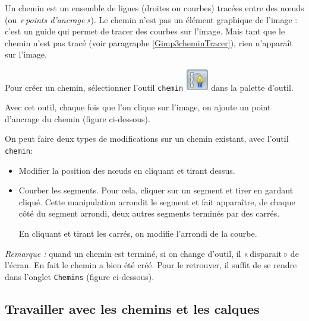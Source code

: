 Un chemin est un ensemble de lignes (droites ou courbes) tracées entre des nœuds (ou \emph{«\,points d'ancrage\,»}). Le chemin n'est pas un élément graphique de l'image : c'est un guide qui permet de tracer des courbes sur l'image. Mais tant que le chemin n'est pas tracé (voir paragraphe \vref{Gimp3cheminTracer}), rien n'apparaît sur l'image. 

Pour créer un chemin, sélectionner l'outil \texttt{chemin} \includegraphics[width=1cm]{./images/image03/Chemin01} dans la palette d'outil.

Avec cet outil, chaque fois que l'on clique sur l'image, on ajoute un point d'ancrage du chemin (figure ci-dessous).



On peut faire deux types de modifications sur un chemin existant, avec l'outil \texttt{chemin}: 
\begin{itemize}
\item Modifier la position des nœuds en cliquant et tirant dessus.
\item Courber les segments. Pour cela, cliquer sur un segment et tirer en gardant cliqué. Cette manipulation arrondit le segment et fait apparaître, de chaque côté du segment arrondi, deux autres segments terminés par des carrés. 


En cliquant et tirant les carrés, on modifie l'arrondi de la courbe.
\end{itemize}


\emph{Remarque :} quand un chemin est terminé, si on change d'outil, il «\,disparait\,» de l'écran. En fait le chemin a bien été créé. Pour le retrouver, il suffit de se rendre dans l'onglet \texttt{Chemins} (figure ci-dessous).








\subsection{Travailler avec les chemins et les calques}\label{Gimp3travaillerChemin}

